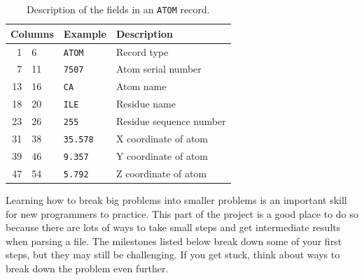 \documentclass{article}
\begin{document}
\begin{table}[h]
\centering
\begin{tabular}{r@{ - }lcll}
\toprule
\multicolumn{3}{l}{Columns} & Example         & Description                         \\
\midrule
 1 &  6 & & \texttt{ATOM}   & Record type                         \\
 7 & 11 & & \texttt{7507}   & Atom serial number                  \\
13 & 16 & & \texttt{CA}     & Atom name                           \\
18 & 20 & & \texttt{ILE}    & Residue name                        \\
23 & 26 & & \texttt{255}    & Residue sequence number             \\
31 & 38 & & \texttt{35.578} & X coordinate of atom                \\
39 & 46 & & \texttt{9.357}  & Y coordinate of atom                \\
47 & 54 & & \texttt{5.792}  & Z coordinate of atom                \\
\bottomrule
\end{tabular}
\caption{Description of the fields in an \texttt{ATOM} record.}
\label{tab:pdb-atom-record}
\end{table}

Learning how to break big problems into smaller problems is an important skill 
for new programmers to practice.  This part of the project is a good place to 
do so because there are lots of ways to take small steps and get intermediate 
results when parsing a file.  The milestones listed below break down some of 
your first steps, but they may still be challenging.  If you get stuck, think 
about ways to break down the problem even further.
\end{document}
